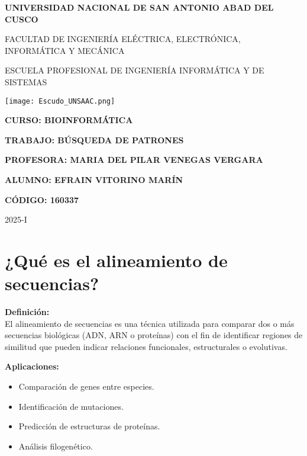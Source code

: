 \documentclass[fleqn,10pt]{article}
\begin{document}
\begin{titlepage}
    \centering
    \vspace*{1cm}
    {\LARGE\bfseries UNIVERSIDAD NACIONAL DE SAN ANTONIO ABAD DEL CUSCO\par}
    \vspace{0.5cm}
    {\Large FACULTAD DE INGENIERÍA ELÉCTRICA, ELECTRÓNICA, INFORMÁTICA Y MECÁNICA\par}
    \vspace{0.5cm}
    {\Large ESCUELA PROFESIONAL DE INGENIERÍA INFORMÁTICA Y DE SISTEMAS\par}
    \vfill
    \texttt{[image: Escudo\_UNSAAC.png]}\par %
    \vfill
    {\Large\bfseries CURSO: BIOINFORMÁTICA\par}
    \vspace{0.3cm}
    {\Large\bfseries TRABAJO: BÚSQUEDA DE PATRONES\par}
    \vspace{0.3cm}
    {\Large\bfseries PROFESORA: MARIA DEL PILAR VENEGAS VERGARA\par}
    \vspace{1cm}
    {\Large\bfseries ALUMNO: EFRAIN VITORINO MARÍN\par}
    {\Large\bfseries CÓDIGO: 160337\par}
    \vfill
    {\Large 2025-I\par}
\end{titlepage}

\setcounter{page}{1}
\pagestyle{plain}
\tableofcontents
\newpage


\section{¿Qué es el alineamiento de secuencias?}
\textbf{Definición:} \\
El alineamiento de secuencias es una técnica utilizada para comparar dos o más secuencias biológicas (ADN, ARN o proteínas) con el fin de identificar regiones de similitud que pueden indicar relaciones funcionales, estructurales o evolutivas.

\textbf{Aplicaciones:}
\begin{itemize}
    \item Comparación de genes entre especies.
    \item Identificación de mutaciones.
    \item Predicción de estructuras de proteínas.
    \item Análisis filogenético.
\end{itemize}
\end{document}
